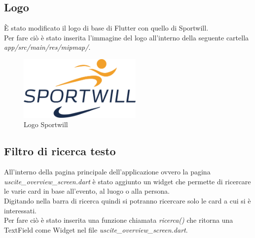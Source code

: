 \subsection{Logo}
È stato modificato il logo di base di Flutter con quello di Sportwill.\\
Per  fare ciò è stato inserita l'immagine del logo all'interno della seguente cartella \textit{app/src/main/res/mipmap/}.\\

\begin{figure}[htbp]	
	\centering
	\includegraphics[width=6cm]{immagini/logosportwill.png}
	\caption{Logo Sportwill}
	\label{fig:Logo Sportwill}
\end{figure}

\newpage

\subsection{Filtro di ricerca testo}
All'interno della pagina principale dell'applicazione ovvero la pagina \textit{uscite\_overview\_screen.dart} è stato aggiunto un widget che permette di ricercare le varie card in base all'evento, al luogo o alla persona.\\
Digitando nella barra di ricerca quindi si potranno ricercare solo le card a cui si è interessati.\\
Per fare ciò è stato inserita una funzione chiamata \textit{ricerca()} che ritorna una TextField come Widget nel file \textit{uscite\_overview\_screen.dart}.\\

